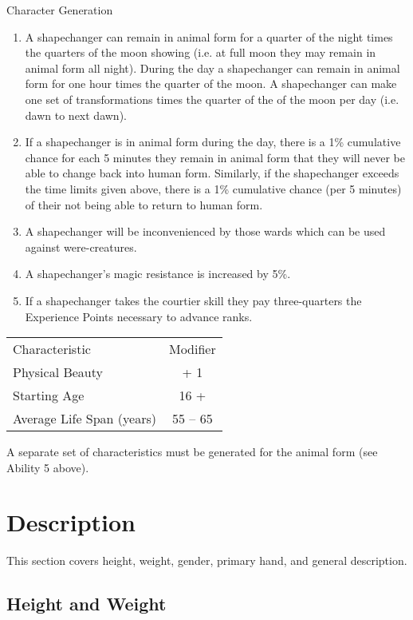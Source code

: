 \begin{Chapter}{Character Generation}
\begin{enumerate}
\item A shapechanger can remain in animal form for a quarter of the
  night times the quarters of the moon showing (i.e. at full moon they
  may remain in animal form all night).  During the day a shapechanger
  can remain in animal form for one hour times the quarter of the
  moon.  A shapechanger can make one set of transformations times the
  quarter of the of the moon per day (i.e. dawn to next dawn).

\item If a shapechanger is in animal form during the day, there is a
  1\% cumulative chance for each 5 minutes they remain in animal form
  that they will never be able to change back into human form.
  Similarly, if the shapechanger exceeds the time limits given above,
  there is a 1\% cumulative chance (per 5 minutes) of their not being
  able to return to human form.

\item A shapechanger will be inconvenienced by those wards which can
  be used against were-creatures.

\item A shapechanger’s magic resistance is increased by 5\%.

\item If a shapechanger takes the courtier skill they pay
  three-quarters the Experience Points necessary to advance ranks.

\end{enumerate}

\begin{tabularx}{\columnwidth}{Xc}
Characteristic			& Modifier \\
Physical Beauty			& + 1 \\
Starting Age			& 16 +  \\
Average Life Span (years)	& 55 -- 65 \\
\end{tabularx}

A separate set of characteristics must be generated for the animal
form (see Ability 5 above).

\section{Description}
\label{description}

This section covers height, weight, gender, primary hand, and general
description.

\subsection{Height and Weight}


\end{Chapter}
